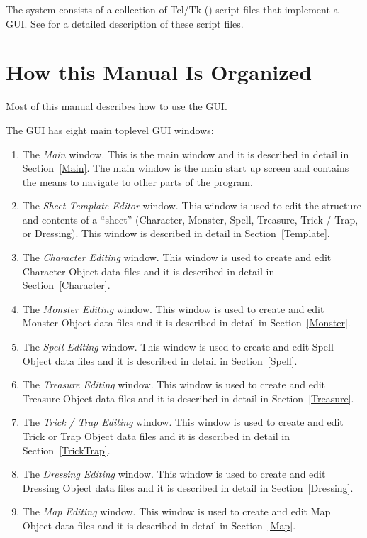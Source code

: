 The system consists of a collection of Tcl/Tk (\cite{Ousterhout94})
script files that implement a GUI.  See \cite{HellerRPGTcl09} for a
detailed description of these script files.

\section{How this Manual Is Organized}

Most of this manual describes how to use the GUI.

The GUI has eight main toplevel GUI windows:

\begin{enumerate}

\item The {\em Main} window.  This is the main window and it is
described in detail in Section~\ref{Main}.  The main window is the main
start up screen and contains the means to navigate to other parts of the
program.

\item The {\em Sheet Template Editor} window.  This window is used to
edit the structure and contents of a ``sheet'' (Character, Monster,
Spell, Treasure, Trick / Trap, or Dressing).  This window is described
in detail in Section~\ref{Template}.

\item The {\em Character Editing} window.  This window is used to create
and edit Character Object data files and it is described in detail in
Section~\ref{Character}. 

\item The {\em Monster Editing} window.  This window is used to create
and edit Monster Object data files and it is described in detail in
Section~\ref{Monster}. 

\item The {\em Spell Editing} window.  This window is used to create
and edit Spell Object data files and it is described in detail in
Section~\ref{Spell}. 

\item The {\em Treasure Editing} window.  This window is used to create
and edit Treasure Object data files and it is described in detail in
Section~\ref{Treasure}. 

\item The {\em Trick / Trap Editing} window.  This window is used to create
and edit Trick or Trap Object data files and it is described in detail in
Section~\ref{TrickTrap}. 

\item The {\em Dressing Editing} window.  This window is used to create
and edit Dressing Object data files and it is described in detail in
Section~\ref{Dressing}. 

\item The {\em Map Editing} window.  This window is used to create
and edit Map Object data files and it is described in detail in
Section~\ref{Map}. 

\end{enumerate}


